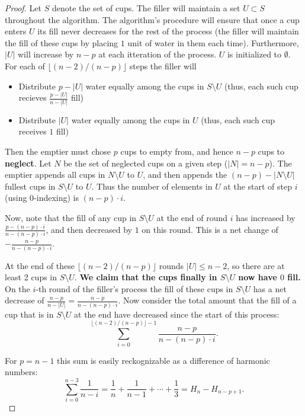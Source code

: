 \documentclass[twocolumn]{article}[11pt]
\begin{document}
\begin{proof}
Let $S$ denote the set of cups. The filler will maintain a set $U \subset S$
throughout the algorithm. The algorithm's procedure will ensure that once a cup
enters $U$ its fill never decreases for the rest of the process (the filler will
maintain the fill of these cups by placing $1$ unit of water in them each time). 
Furthermore, $|U|$ will increase by $n-p$ at each itteration of the process.
$U$ is initialized to $\emptyset$. For each of $\lfloor(n-2) / (n-p)\rfloor$ steps the filler will
\begin{itemize}
  \item Distribute $p - |U|$ water equally among the cups in $S\setminus U$ (thus, each such cup recieves $\frac{p-|U|}{n-|U|}$ fill)
  \item Distribute $|U|$ water equally among the cups in $U$ (thus, each such cup receives $1$ fill)
\end{itemize}

Then the emptier must chose $p$ cups to empty from, and hence $n-p$ cups to \textbf{neglect}.
Let $N$ be the set of neglected cups on a given step ($|N| = n-p$).
The emptier appends all cups in $N \setminus U$ to $U$, and then appends the
$(n-p) - |N\setminus U |$ fullest cups in $S \setminus U$ to $U$.  Thus the
number of elements in $U$ at the start of step $i$ (using $0$-indexing) is 
$(n-p)\cdot i$.

Now, note that the fill of any cup in $S \setminus U$ at the end of round $i$
has increased by $\frac{p-(n-p)\cdot i}{n-(n-p)\cdot i}$, and then decreased by
$1$ on this round. This is a net change of $-\frac{n-p}{n-(n-p)\cdot i}$.

At the end of these $\lfloor (n-2) / (n-p) \rfloor$ rounds $|U| \le n-2$, so
there are at least 2 cups in $S \setminus U$.
\textbf{We claim that the cups finally in $S\setminus U$ now have $0$ fill.}
On the $i$-th round of the filler's process the fill of these cups in $S
\setminus U$ has a net decrease of $\frac{n-p}{n-|U|} = \frac{n-p}{n-(n-p)\cdot i}$. 
Now consider the total amount that the fill of a cup that is in $S\setminus U$ at the end
have decreased since the start of this process:
$$\sum_{i=0}^{\lfloor(n-2) / (n-p)\rfloor - 1} \frac{n-p}{n-(n-p)\cdot i}.$$

For $p = n-1$ this sum is easily reckognizable as a difference of harmonic
numbers: $$\sum_{i=0}^{n-3}\frac{1}{n-i} = \frac{1}{n} + \frac{1}{n-1} + \cdots
+ \frac{1}{3} =  H_{n} - H_{n-p+1}.$$


\end{proof}
\end{document}
